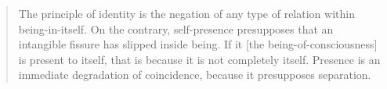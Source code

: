 \blockcquote[127]{Sartre}{%
    The principle of identity is the negation of any type of relation within being-in-itself. On the contrary, self-presence presupposes that an intangible fissure has slipped inside being. If it [the being-of-consciousness] is present to itself, that is because it is not completely itself. Presence is an immediate degradation of coincidence, because it presupposes separation.
}




